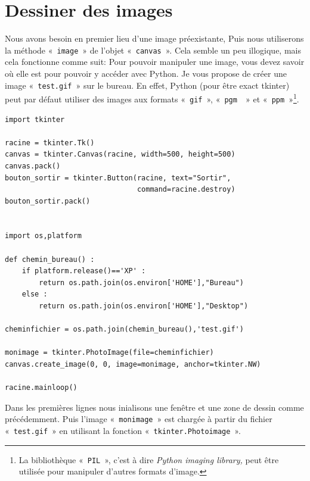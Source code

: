 \section{Dessiner des images}
\label{sec:dessinimages}

Nous avons besoin en premier lieu d'une image préexistante, Puis nous utiliserons la méthode «~\texttt{image}~» de l'objet «~\texttt{canvas}~». Cela semble un peu illogique, mais cela fonctionne comme suit: 
Pour pouvoir manipuler une image, vous devez savoir où elle est pour pouvoir y accéder avec Python. Je vous propose de créer une image «~\texttt{test.gif}~» sur le bureau. En effet, Python (pour être exact tkinter) peut par défaut utiliser des images aux formats «~\texttt{gif}~», «~\texttt{pgm~}~» et «~\texttt{ppm}~»\footnote{La bibliothèque «~\texttt{PIL}~», c'est à dire \emph{Python imaging library,} peut être utilisée pour manipuler d'autres formats d'image.}.



\begin{Verbatim}[frame=single,rulecolor=\color{mbleu}, label=à taper]
import tkinter

racine = tkinter.Tk()
canvas = tkinter.Canvas(racine, width=500, height=500)
canvas.pack()
bouton_sortir = tkinter.Button(racine, text="Sortir",
                               command=racine.destroy)
bouton_sortir.pack()


import os,platform

def chemin_bureau() :
    if platform.release()=='XP' :
        return os.path.join(os.environ['HOME'],"Bureau")
    else :
        return os.path.join(os.environ['HOME'],"Desktop")
    
cheminfichier = os.path.join(chemin_bureau(),'test.gif')

monimage = tkinter.PhotoImage(file=cheminfichier)
canvas.create_image(0, 0, image=monimage, anchor=tkinter.NW)

racine.mainloop()
\end{Verbatim}

Dans les premières lignes nous inialisons une fenêtre et une zone de dessin comme précédemment.
Puis l'image «~\texttt{monimage}~» est chargée à partir du fichier «~\texttt{test.gif}~» en utilisant la fonction «~\texttt{tkinter.Photoimage}~».

